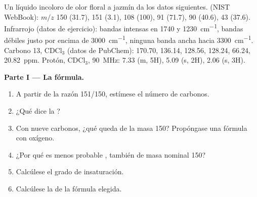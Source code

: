 \begin{problem}
\label{pb:b2:structure-determination:1}
Un líquido incoloro de olor floral a jazmín da los datos siguientes.  (NIST
WebBook): $m/z$ 150 (31.7), 151 (3.1), 108 (100), 91 (71.7), 90 (40.6), 43 (37.6). Infrarrojo (datos de
ejercicio): bandas intensas en 1740 y \qty{1230}{cm^{-1}}, bandas débiles justo por encima de \qty{3000}{cm^{-1}}, ninguna
banda ancha hacia \qty{3300}{cm^{-1}}. Carbono 13, CDCl$_3$ (datos de PubChem): 170.70, 136.14, 128.56,
128.24, 66.24, 20.82~ppm. Protón, CDCl$_3$, \qty{90}{MHz}: 7.33 (m, 5H), 5.09 (s, 2H), 2.06 (s, 3H).

\begin{center}
\end{center}

\medskip
\noindent\textbf{Parte I --- La fórmula.}
\begin{enumerate}
  \item A partir de la razón 151/150, estímese el número de carbonos.
  \item ¿Qué dice la ?
  \item Con nueve carbonos, ¿qué queda de la masa 150? Propóngase una fórmula con oxígeno.
  \item ¿Por qué es menos probable , también de masa nominal 150?
  \item Calcúlese el grado de insaturación.
  \item Calcúlese la  de la fórmula elegida.
\end{enumerate}


\end{problem}
